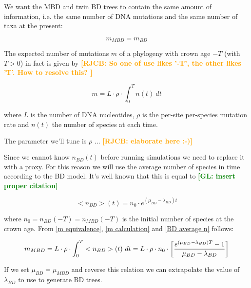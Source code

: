 \documentclass{article}
\newcommand*\richel[1]{\textcolor{orange}{\textbf{[RJCB: #1]}}}
\newcommand*\gio[1]{\textcolor{green}{\textbf{[GL: #1]}}}
\begin{document}
\begin{itemize}
We want the MBD and twin BD trees to contain the same amount of information, 
i.e. the same number of DNA mutations and the same number of taxa at the present:

\begin{equation}
m_{MBD} = m_{BD} \label{m equivalence}
\end{equation} 

The expected number of mutations $m$ of a phylogeny 
with crown age $-T$ (with $T>0$) in fact is given by
\richel{
  So one of use likes '-T', the other likes 'T'. How to resolve this?
}

\begin{equation}
m = L \cdot \rho \cdot \int_{0}^{T} n(t)\ dt \label{m calculation}
\end{equation}

where $L$ is the number of DNA nucleotides, 
$\rho$ is the per-site per-species mutation rate and
$n(t)$ the number of species at each time.

The parameter we'll tune is $\rho$ ... \richel{elaborate here :-)}

Since we cannot know $n_{BD}(t)$ before running simulations
we need to replace it with a proxy. 
For this reason we will use the average number of
species in time according to the BD model. 
It's well known that this is equal to \gio{insert proper citation}

\begin{equation}
    <n_{BD}>(t) = n_{0} \cdot e^{(\mu_{BD} - \lambda_{BD})t} \label{BD average n}
\end{equation}

where $n_{0} = n_{BD}(-T) = n_{MBD}(-T)$ is the initial number of species 
at the crown age.
From \ref{m equivalence}, \ref{m calculation} and \ref{BD average n} follows:

\begin{equation}
m_{MBD} = L \cdot \rho \cdot \int_{0}^{T} <n_{BD}>(t)\ dt \\
= L \cdot \rho \cdot n_{0} \cdot \left[ \frac{e^{(\mu_{BD} - \lambda_{BD})T} - 1}{\mu_{BD} - \lambda_{BD}} \right]
\end{equation}

If we set $\mu_{BD} = \mu_{MBD}$ and reverse this relation 
we can extrapolate the value of $\lambda_{BD}$ to use to generate BD trees.


\end{itemize}
\end{document}
